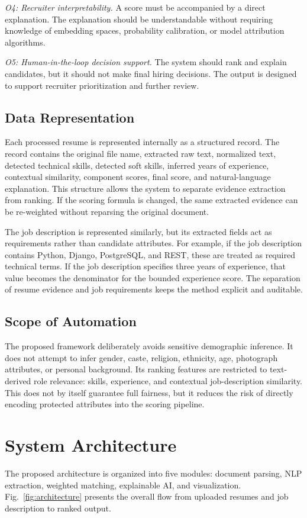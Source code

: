 \documentclass[conference]{IEEEtran}
\newcounter{algorithm}
\begin{document}
\textit{O4: Recruiter interpretability.} A score must be accompanied by a direct explanation. The explanation should be understandable without requiring knowledge of embedding spaces, probability calibration, or model attribution algorithms.

\textit{O5: Human-in-the-loop decision support.} The system should rank and explain candidates, but it should not make final hiring decisions. The output is designed to support recruiter prioritization and further review.

\subsection{Data Representation}
Each processed resume is represented internally as a structured record. The record contains the original file name, extracted raw text, normalized text, detected technical skills, detected soft skills, inferred years of experience, contextual similarity, component scores, final score, and natural-language explanation. This structure allows the system to separate evidence extraction from ranking. If the scoring formula is changed, the same extracted evidence can be re-weighted without reparsing the original document.

The job description is represented similarly, but its extracted fields act as requirements rather than candidate attributes. For example, if the job description contains Python, Django, PostgreSQL, and REST, these are treated as required technical terms. If the job description specifies three years of experience, that value becomes the denominator for the bounded experience score. The separation of resume evidence and job requirements keeps the method explicit and auditable.

\subsection{Scope of Automation}
The proposed framework deliberately avoids sensitive demographic inference. It does not attempt to infer gender, caste, religion, ethnicity, age, photograph attributes, or personal background. Its ranking features are restricted to text-derived role relevance: skills, experience, and contextual job-description similarity. This does not by itself guarantee full fairness, but it reduces the risk of directly encoding protected attributes into the scoring pipeline.

\section{System Architecture}
The proposed architecture is organized into five modules: document parsing, NLP extraction, weighted matching, explainable AI, and visualization. Fig.~\ref{fig:architecture} presents the overall flow from uploaded resumes and job description to ranked output.
\end{document}
